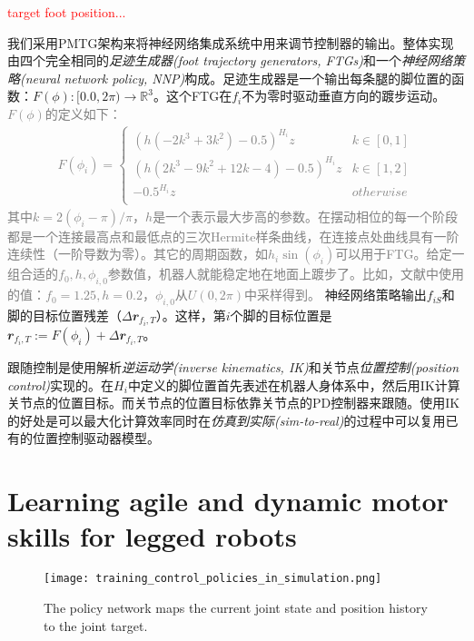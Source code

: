 \textcolor{red}{target foot position...}

我们采用PMTG架构来将神经网络集成系统中用来调节控制器的输出。整体实现由四个完全相同的\emph{足迹生成器(foot trajectory generators, FTGs)}和一个\emph{神经网络策略(neural network policy, NNP)}构成。足迹生成器是一个输出每条腿的脚位置的函数：$F(\phi):[0.0,2\pi)\to \mathbb{R}^3$。这个FTG在$f_i$不为零时驱动垂直方向的踱步运动。
\textcolor{gray}{\small
$F(\phi)$的定义如下：
\begin{align}
    F(\phi_i)=\begin{cases}
        (h(-2k^3+3k^2)-0.5)^{H_i}z &k\in[0,1]\\
        (h(2k^3-9k^2+12k-4)-0.5)^{H_i}z &k\in[1,2]\\
        -0.5^{H_i}z & otherwise\\
    \end{cases}
\end{align}
其中$k=2(\phi_i-\pi)/\pi$，$h$是一个表示最大步高的参数。在摆动相位的每一个阶段都是一个连接最高点和最低点的三次Hermite样条曲线，在连接点处曲线具有一阶连续性（一阶导数为零）。其它的周期函数，如$h_i \sin (\phi_i)$可以用于FTG。给定一组合适的$f_0,h,\phi_{i,0}$参数值，机器人就能稳定地在地面上踱步了。比如，文献\cite[p7]{Lee_Hwangbo_Wellhausen_Koltun_Hutter_2020}中使用的值：$f_0=1.25,h=0.2$，$\phi_{i,0}$从$U(0,2\pi)$中采样得到。}
神经网络策略输出$f_{iS}$和脚的目标位置残差（$\Delta \mathbfit{r}_{f_i, T}$）。这样，第$i$个脚的目标位置是$\mathbfit{r}_{f_i, T}:=F(\phi_i)+\Delta \mathbfit{r}_{f_i, T}$。

跟随控制是使用解析\emph{逆运动学(inverse kinematics, IK)}和关节点\emph{位置控制(position control)}实现的。在$H_i$中定义的脚位置首先表述在机器人身体系中，然后用IK计算关节点的位置目标。而关节点的位置目标依靠关节点的PD控制器来跟随。使用IK的好处是可以最大化计算效率同时在\emph{仿真到实际(sim-to-real)}的过程中可以复用已有的位置控制驱动器模型\cite[p]{Lee_Hwangbo_Hutter_2019,Hwangbo_Bellicoso_Fankhauser_Huttery_2016}。









\section[RL案例2]{Learning agile and dynamic motor skills for legged robots\cite[p8]{Hwangbo_Lee_Dosovitskiy_Bellicoso_Tsounis_Koltun_Hutter_2019}}

\begin{figure}
    \centering
    \texttt{[image: training\_control\_policies\_in\_simulation.png]}
    \caption[Training control policies in simulation]{The policy network maps the current joint state and position history to the joint target. }
    \label{fig:training_control_policies_in_simulation}
\end{figure}

